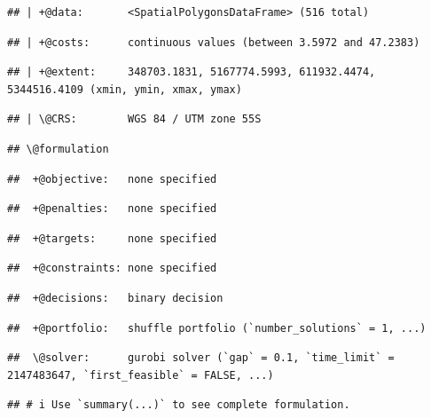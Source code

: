 \documentclass[
  12pt,
]{book}
\begin{document}
\begin{verbatim}
## | +@data:       <SpatialPolygonsDataFrame> (516 total)
\end{verbatim}

\begin{verbatim}
## | +@costs:      continuous values (between 3.5972 and 47.2383)
\end{verbatim}

\begin{verbatim}
## | +@extent:     348703.1831, 5167774.5993, 611932.4474, 5344516.4109 (xmin, ymin, xmax, ymax)
\end{verbatim}

\begin{verbatim}
## | \@CRS:        WGS 84 / UTM zone 55S
\end{verbatim}

\begin{verbatim}
## \@formulation
\end{verbatim}

\begin{verbatim}
##  +@objective:   none specified
\end{verbatim}

\begin{verbatim}
##  +@penalties:   none specified
\end{verbatim}

\begin{verbatim}
##  +@targets:     none specified
\end{verbatim}

\begin{verbatim}
##  +@constraints: none specified
\end{verbatim}

\begin{verbatim}
##  +@decisions:   binary decision
\end{verbatim}

\begin{verbatim}
##  +@portfolio:   shuffle portfolio (`number_solutions` = 1, ...)
\end{verbatim}

\begin{verbatim}
##  \@solver:      gurobi solver (`gap` = 0.1, `time_limit` = 2147483647, `first_feasible` = FALSE, ...)
\end{verbatim}

\begin{verbatim}
## # i Use `summary(...)` to see complete formulation.
\end{verbatim}
\end{document}
